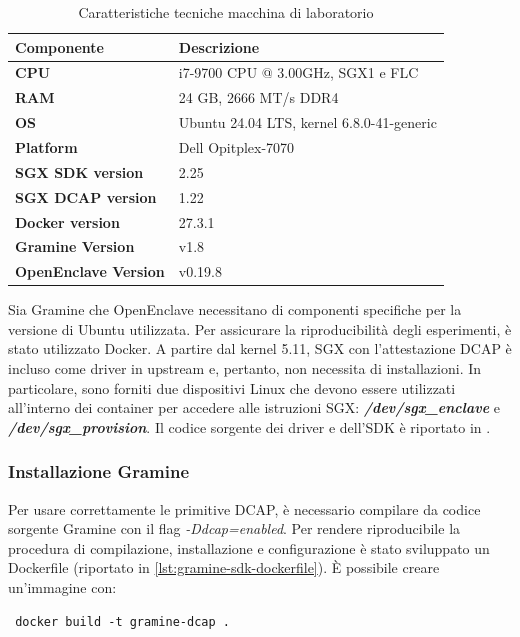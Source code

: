 \documentclass{article}
\begin{document}
\begin{table}[h]
\centering
\begin{tabular}{|l|p{7cm}|}
\hline
 Componente & Descrizione \\ \hline
\textbf{CPU} & i7-9700 CPU @ 3.00GHz, SGX1 e FLC  \\ \hline
\textbf{RAM} & 24 GB, 2666 MT/s DDR4 \\ \hline
\textbf{OS} & Ubuntu 24.04 LTS, kernel 6.8.0-41-generic \\ \hline
\textbf{Platform} & Dell Opitplex-7070 \\ \hline
\textbf{SGX SDK version} & 2.25 \\ \hline
\textbf{SGX DCAP version} & 1.22 \\ \hline
\textbf{Docker version} & 27.3.1 \\ \hline
\textbf{Gramine Version} & v1.8 \\ \hline
\textbf{OpenEnclave Version} & v0.19.8 \\ \hline
\end{tabular}
\caption{Caratteristiche tecniche macchina di laboratorio}
\label{tab:lab-spec}
\end{table}

Sia Gramine che OpenEnclave necessitano di componenti specifiche per la versione di Ubuntu utilizzata. Per assicurare la riproducibilità degli esperimenti, è stato utilizzato Docker. A partire dal kernel 5.11, SGX con l'attestazione DCAP è incluso come driver in upstream e, pertanto, non necessita di installazioni. In particolare, sono forniti due dispositivi Linux che devono essere utilizzati all'interno dei container per accedere alle istruzioni SGX: \textbf{\textit{/dev/sgx\_enclave}} e \textbf{\textit{/dev/sgx\_provision}}. Il codice sorgente dei driver e dell'SDK è riportato in \cite{linux-sgx}.

\subsubsection{Installazione Gramine}
Per usare correttamente le primitive DCAP, è necessario compilare da codice sorgente Gramine con il flag \textit{-Ddcap=enabled}. Per rendere riproducibile la procedura di compilazione, installazione e configurazione è stato sviluppato un Dockerfile (riportato in \cref{lst:gramine-sdk-dockerfile}). È possibile creare un'immagine con:
\begin{verbatim}
 docker build -t gramine-dcap . 
\end{verbatim}

\end{document}
